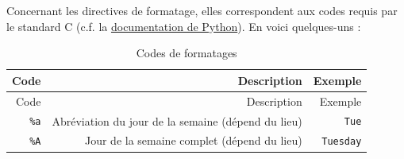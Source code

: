 \documentclass[12pt,]{book}
\numberwithin{equation}{section}
\numberwithin{countremarque}{section}
\begin{document}
Concernant les directives de formatage, elles correspondent aux codes
requis par le standard C (c.f. la
\href{https://docs.python.org/fr/3/library/datetime.html\#strftime-strptime-behavior}{documentation
de Python}). En voici quelques-uns :

\begin{longtable}[]{@{}rrr@{}}
\caption{Codes de formatages}\tabularnewline
\toprule
\begin{minipage}[b]{0.10\columnwidth}\raggedleft\strut
Code\strut
\end{minipage} & \begin{minipage}[b]{0.60\columnwidth}\raggedleft\strut
Description\strut
\end{minipage} & \begin{minipage}[b]{0.22\columnwidth}\raggedleft\strut
Exemple\strut
\end{minipage}\tabularnewline
\midrule
\endfirsthead
\toprule
\begin{minipage}[b]{0.10\columnwidth}\raggedleft\strut
Code\strut
\end{minipage} & \begin{minipage}[b]{0.60\columnwidth}\raggedleft\strut
Description\strut
\end{minipage} & \begin{minipage}[b]{0.22\columnwidth}\raggedleft\strut
Exemple\strut
\end{minipage}\tabularnewline
\midrule
\endhead
\begin{minipage}[t]{0.10\columnwidth}\raggedleft\strut
\texttt{\%a}\strut
\end{minipage} & \begin{minipage}[t]{0.60\columnwidth}\raggedleft\strut
Abréviation du jour de la semaine (dépend du lieu)\strut
\end{minipage} & \begin{minipage}[t]{0.22\columnwidth}\raggedleft\strut
\texttt{Tue}\strut
\end{minipage}\tabularnewline
\begin{minipage}[t]{0.10\columnwidth}\raggedleft\strut
\texttt{\%A}\strut
\end{minipage} & \begin{minipage}[t]{0.60\columnwidth}\raggedleft\strut
Jour de la semaine complet (dépend du lieu)\strut
\end{minipage} & \begin{minipage}[t]{0.22\columnwidth}\raggedleft\strut
\texttt{Tuesday}\strut
\end{minipage}\tabularnewline

\end{longtable}
\end{document}
